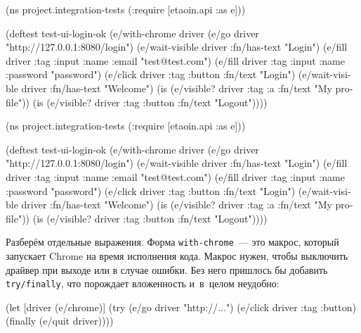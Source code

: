 \begin{english}
  \begin{clojure}
(ns project.integration-tests
  (:require [etaoin.api :as e]))

(deftest test-ui-login-ok
  (e/with-chrome {} driver
    (e/go driver
      "http://127.0.0.1:8080/login")
    (e/wait-visible driver
      {:fn/has-text "Login"})
    (e/fill driver
      {:tag :input :name :email}
      "test@test.com")
    (e/fill driver
      {:tag :input :name :password}
      "password")
    (e/click driver
      {:tag :button :fn/text "Login"})
    (e/wait-visible driver
      {:fn/has-text "Welcome"})
    (is (e/visible? driver
          {:tag :a
           :fn/text "My profile"}))
    (is (e/visible? driver
          {:tag :button
           :fn/text "Logout"}))))
  \end{clojure}
\end{english}

\else

\begin{english}
  \begin{clojure}
(ns project.integration-tests
  (:require [etaoin.api :as e]))

(deftest test-ui-login-ok
  (e/with-chrome {} driver
    (e/go driver "http://127.0.0.1:8080/login")
    (e/wait-visible driver {:fn/has-text "Login"})
    (e/fill driver
       {:tag :input :name :email} "test@test.com")
    (e/fill driver
       {:tag :input :name :password} "password")
    (e/click driver {:tag :button :fn/text "Login"})
    (e/wait-visible driver {:fn/has-text "Welcome"})
    (is (e/visible? driver
           {:tag :a :fn/text "My profile"}))
    (is (e/visible? driver
           {:tag :button :fn/text "Logout"}))))
  \end{clojure}
\end{english}

\fi

Разберём отдельные выражения. Форма \verb|with-chrome|~--- это макрос, который
запускает Chrome на время исполнения кода. Макрос нужен, чтобы выключить драйвер
при выходе или в случае ошибки. Без него пришлось бы добавить
\verb|try/finally|, что порождает вложенность и~в~целом неудобно:


\begin{english}
  \begin{clojure}
(let [driver (e/chrome)]
  (try
    (e/go driver "http://...")
    (e/click driver {:tag :button})
    (finally
      (e/quit driver))))
  \end{clojure}
\end{english}

